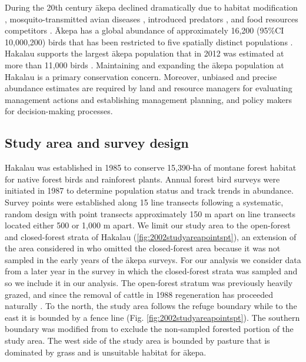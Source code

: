 \documentclass[preprint,12pt]{elsarticle}
\newcommand{\akepa}{\textquotesingle\={a}kepa}  %
\newcommand{\Akepa}{\textquotesingle\={A}kepa}  %
\begin{document}
During the 20th century \akepa{} declined dramatically due to habitat modification \citep{scott_HFBS_1986, pratt_avifaunal_1994},  mosquito-transmitted avian diseases \citep{pratt_avifaunal_1994, atkinson_wildlife_1995}, introduced predators \citep{lepson_akepa_1997}, and food resources competitors \citep{lepson_akepa_1997}. \Akepa{} has a global abundance of approximately 16,200 (95\%CI 10,000,200) birds that has been restricted to five spatially distinct populations \citep{judge_akepa_2018}. Hakalau supports the largest \akepa{} population that in 2012 was estimated at more than 11,000 birds \citep{camp_statespace_2016}. Maintaining and expanding the \akepa{} population at Hakalau is a primary conservation concern. Moreover, unbiased and precise abundance estimates are required by land and resource managers for evaluating management actions and establishing management planning, and policy makers for decision-making processes.

\subsection{Study area and survey design}

Hakalau was established in 1985 to conserve 15,390-ha of montane forest habitat for native forest birds and rainforest plants. Annual forest bird surveys were initiated in 1987 to determine population status and track trends in abundance. Survey points were established along 15 line transects following a systematic, random design with point transects approximately 150 m apart on line transects located either 500 or 1,000 m apart. We limit our study area to the open-forest and closed-forest strata of Hakalau (\autoref{fig:2002studyareapointspt}), an extension of the area considered in \cite{camp_population_2010, camp_statespace_2016} who omitted the closed-forest area because it was not sampled in the early years of the \akepa{} surveys.  For our analysis we consider data from a later year in the survey in which the closed-forest strata was sampled and so we include it in our analysis.  The open-forest stratum was previously heavily grazed, and since the removal of cattle in 1988 regeneration has proceeded naturally \citep{maxfield_hakalau_1998}. To the north, the study area follows the refuge boundary while to the east it is bounded by a fence line (Fig. \ref{fig:2002studyareapointspt}). The southern boundary was modified from \cite{camp_population_2010} to exclude the non-sampled forested portion of the study area. The west side of the study area is bounded by pasture that is dominated by grass and is unsuitable habitat for \akepa.
\end{document}

